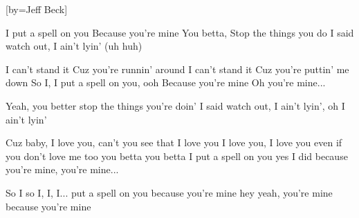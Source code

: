[by={Jeff Beck}]

  \chordsoff


  
  \beginverse
  I put a spell on you
  Because you're mine
  You betta, Stop the things you do
  I said watch out, I ain't lyin' (uh huh)
  \endverse
  
  \beginchorus

  I can't stand it
  Cuz you're runnin' around
  I can't stand it
  Cuz you're puttin' me down
  So I, I put a spell on you, ooh
  Because you're mine
  Oh you're mine...
  \endchorus
  
  
  \beginverse
  Yeah, you better stop the things you're doin'
  I said watch out, I ain't lyin', oh I ain't lyin'
  \brk
  \endverse
  
  \beginchorus
  
  Cuz baby, I love you,
  can't you see that I love you
  I love you, I love you
  even if you don't love me too
  you betta you betta
  I put a spell on you
  yes I did
  because you're mine, you're mine...
  \endchorus

  \beginchorus
  So I so I, I, I... put a spell on you
  because you're mine
  hey yeah, you're mine
  because you're mine
  \endchorus
\endsong

